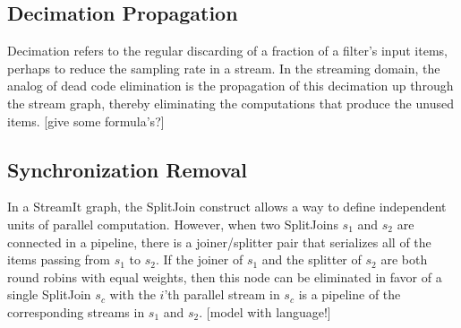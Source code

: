 \subsection{Decimation Propagation}

Decimation refers to the regular discarding of a fraction of a filter's
input items, perhaps to reduce the sampling rate in a stream.  In the
streaming domain, the analog of dead code elimination is the propagation
of this decimation up through the stream graph, thereby eliminating the
computations that produce the unused items.  [give some formula's?]

\subsection{Synchronization Removal}

In a StreamIt graph, the SplitJoin construct allows a way to define
independent units of parallel computation.  However, when two SplitJoins
$s_1$ and $s_2$ are connected in a pipeline, there is a joiner/splitter
pair that serializes all of the items passing from $s_1$ to $s_2$.  If
the joiner of $s_1$ and the splitter of $s_2$ are both round robins with
equal weights, then this node can be eliminated in favor of a single
SplitJoin $s_c$ with the $i$'th parallel stream in $s_c$ is a pipeline
of the corresponding streams in $s_1$ and $s_2$.  [model with language!]

